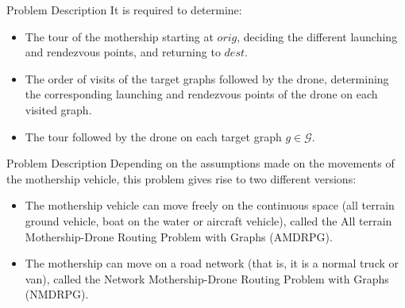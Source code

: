 \documentclass[slidestop,usepdftitle=false,10pt]{beamer}
\begin{document}
	\begin{frame}{Problem Description}
	It is required to determine:
	    \begin{itemize}
	        \item The tour of the mothership starting at $orig$, deciding the different launching and rendezvous points, and returning to $dest$.
	        \item The order of visits of the target graphs followed by the drone, determining the corresponding launching and rendezvous points of the drone on each visited graph.
	        \item The tour followed by the drone on each target graph $g \in \mathcal{G}$.
	    \end{itemize}
	\end{frame}
	
	\begin{frame}{Problem Description}
	    Depending on the assumptions made on the movements of the mothership vehicle, this problem gives rise to two different versions: 
	    \begin{itemize}
	        \item The mothership vehicle can move freely on the continuous space (all terrain ground vehicle, boat on the water or aircraft vehicle), called the All terrain Mothership-Drone Routing Problem with Graphs (AMDRPG).
	        \item The mothership can move on a road network (that is, it is a normal truck or van), called the Network Mothership-Drone Routing Problem with Graphs (NMDRPG).
	    \end{itemize}
	\end{frame}
	
\end{document}
